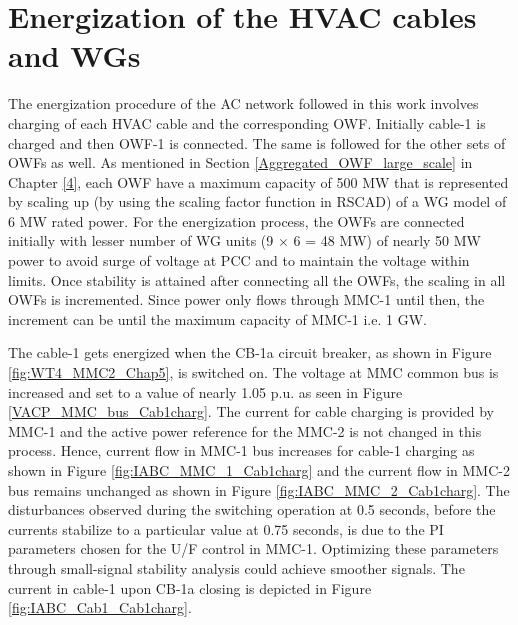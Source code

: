 \section{Energization of the HVAC cables and WGs}\label{energization_HVAC_Cables}
The energization procedure of the \gls{AC} network followed in this work involves charging of each \gls{HVAC} cable and the corresponding \gls{OWF}. Initially cable-1 is charged and then \gls{OWF}-1 is connected. The same is followed for the other sets of \gls{OWF}s as well. As mentioned in Section \ref{Aggregated_OWF_large_scale} in Chapter \ref{4}, each \gls{OWF} have a maximum capacity of 500 MW that is represented by scaling up (by using the scaling factor function in RSCAD) of a \gls{WG} model of 6 MW rated power. For the energization process, the \gls{OWF}s are connected initially with lesser number of \gls{WG} units (9 $\times$ 6 = 48 MW) of nearly 50 MW power to avoid surge of voltage at \gls{PCC} and to maintain the voltage within limits. Once stability is attained after connecting all the \gls{OWF}s, the scaling in all \gls{OWF}s is incremented. Since power only flows through \gls{MMC}-1 until then, the increment can be until the maximum capacity of \gls{MMC}-1 i.e. 1 GW.

The cable-1 gets energized when the CB-1a circuit breaker, as shown in Figure \ref{fig:WT4_MMC2_Chap5}, is switched on. The voltage at \gls{MMC} common bus is increased and set to a value of nearly 1.05 p.u. as seen in Figure \ref{VACP_MMC_bus_Cab1charg}. The current for cable charging is provided by \gls{MMC}-1 and the active power reference for the \gls{MMC}-2 is not changed in this process. Hence, current flow in \gls{MMC}-1 bus increases for cable-1 charging as shown in Figure \ref{fig:IABC_MMC_1_Cab1charg} and the current flow in \gls{MMC}-2 bus remains unchanged as shown in Figure \ref{fig:IABC_MMC_2_Cab1charg}. The disturbances observed during the switching operation at 0.5 seconds, before the currents stabilize to a particular value at 0.75 seconds, is due to the \gls{PI} parameters chosen for the U/F control in \gls{MMC}-1. Optimizing these parameters through small-signal stability analysis could achieve smoother signals. The current in cable-1 upon CB-1a closing is depicted in Figure \ref{fig:IABC_Cab1_Cab1charg}. 

